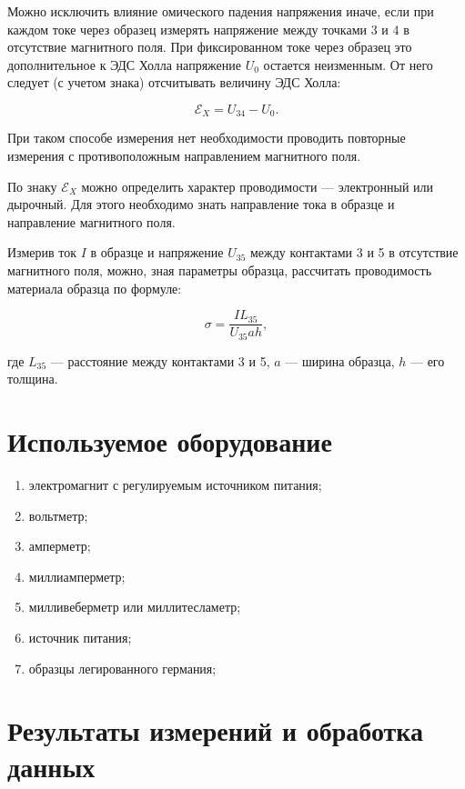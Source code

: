 \documentclass[a4paper, 12pt]{article}
\begin{document}
  	Можно исключить влияние омического падения напряжения иначе, если при каждом токе через образец измерять напряжение между точками 3 и 4 в отсутствие магнитного поля. При фиксированном токе через образец это дополнительное к ЭДС Холла напряжение $U_{0}$ остается неизменным. От него следует (с учетом
  	знака) отсчитывать величину ЭДС Холла: 
  	
  	$$\mathscr{E}_{X} = U_{34} - U_{0}.$$
  	
  	При таком способе измерения нет необходимости проводить повторные измерения с противоположным направлением магнитного поля.
  	
  	
  	По знаку $\mathscr{E}_{X}$ можно определить характер проводимости --- электронный или дырочный. Для этого необходимо знать направление тока в образце и направление
  	магнитного поля.
  	
  	Измерив ток $I$ в образце и напряжение $U_{35}$ между контактами 3 и 5 в отсутствие магнитного поля, можно, зная параметры образца, рассчитать проводимость материала образца по формуле:
  	
  \begin{equation}\label{sigma}
  	\sigma=\dfrac{IL_{35}}{U_{35}ah},
  \end{equation}
  	
где $L_{35}$ --- расстояние между контактами 3 и 5, $a$ --- ширина образца, $h$ --- его толщина.
  	
\section{Используемое оборудование}

\begin{enumerate}
    \item электромагнит с регулируемым источником питания;
    \item вольтметр;
    \item амперметр;
    \item миллиамперметр;
    \item милливеберметр или миллитесламетр;
    \item источник питания;
    \item образцы легированного германия;
\end{enumerate}

\section{Результаты измерений и обработка данных}
\end{document}
